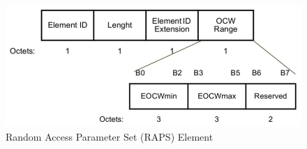 \begin{figure}[!h]
\includegraphics[scale=0.3]{./figure/RAPS.png}
\caption{Random Access Parameter Set (RAPS) Element}
\label{fig_RAPS}
\end{figure}

